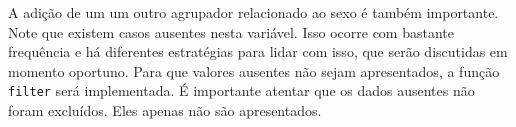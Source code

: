 \documentclass[
]{book}
\newenvironment{Shaded}{\begin{snugshade}}{\end{snugshade}}
\newcommand{\KeywordTok}[1]{\textcolor[rgb]{0.13,0.29,0.53}{\textbf{#1}}}
\newcommand{\NormalTok}[1]{#1}
\newcommand{\OperatorTok}[1]{\textcolor[rgb]{0.81,0.36,0.00}{\textbf{#1}}}
\newcommand{\StringTok}[1]{\textcolor[rgb]{0.31,0.60,0.02}{#1}}
\begin{document}
A adição de um um outro agrupador relacionado ao sexo é também
importante. Note que existem casos ausentes nesta variável. Isso ocorre
com bastante frequência e há diferentes estratégias para lidar com isso,
que serão discutidas em momento oportuno. Para que valores ausentes não
sejam apresentados, a função \texttt{filter} será implementada. É
importante atentar que os dados ausentes não foram excluídos. Eles
apenas não são apresentados.

\begin{Shaded}
\end{Shaded}
\end{document}
